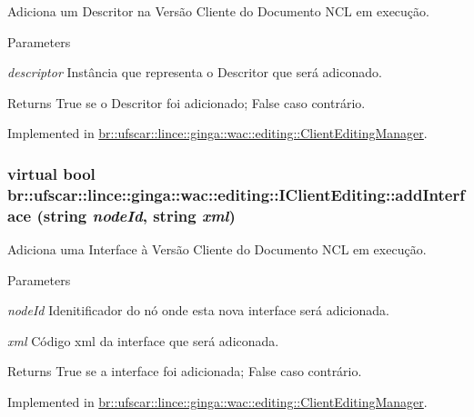 Adiciona um Descritor na Versão Cliente do Documento NCL em execução. 


\begin{DoxyParams}{Parameters}
\item[{\em descriptor}]Instância que representa o Descritor que será adiconado. \end{DoxyParams}
\begin{DoxyReturn}{Returns}
True se o Descritor foi adicionado; False caso contrário. 
\end{DoxyReturn}


Implemented in \hyperlink{classbr_1_1ufscar_1_1lince_1_1ginga_1_1wac_1_1editing_1_1ClientEditingManager_ad43d65396682df3c57e131e5531e7e4d}{br::ufscar::lince::ginga::wac::editing::ClientEditingManager}.

\hypertarget{classbr_1_1ufscar_1_1lince_1_1ginga_1_1wac_1_1editing_1_1IClientEditing_af60b6d775c412012b85a219311bbc4d8}{
\subsubsection[{addInterface}]{\setlength{\rightskip}{0pt plus 5cm}virtual bool br::ufscar::lince::ginga::wac::editing::IClientEditing::addInterface (string {\em nodeId}, \/  string {\em xml})}}
\label{classbr_1_1ufscar_1_1lince_1_1ginga_1_1wac_1_1editing_1_1IClientEditing_af60b6d775c412012b85a219311bbc4d8}


Adiciona uma Interface à Versão Cliente do Documento NCL em execução. 


\begin{DoxyParams}{Parameters}
\item[{\em nodeId}]Idenitificador do nó onde esta nova interface será adicionada. \item[{\em xml}]Código xml da interface que será adiconada. \end{DoxyParams}
\begin{DoxyReturn}{Returns}
True se a interface foi adicionada; False caso contrário. 
\end{DoxyReturn}


Implemented in \hyperlink{classbr_1_1ufscar_1_1lince_1_1ginga_1_1wac_1_1editing_1_1ClientEditingManager_a1565a7f4347ad519fc405455c603fb3c}{br::ufscar::lince::ginga::wac::editing::ClientEditingManager}.

